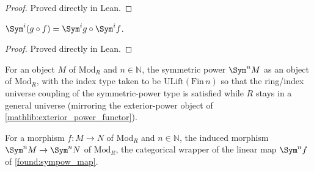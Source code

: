 \begin{proof}

\leanok
  Proved directly in Lean.
\end{proof}

\begin{lemma}
  \label{found:sympow_map_comp}
  \(\Sym^i(g\circ f)=\Sym^i g\circ\Sym^i f\).
\end{lemma}

\begin{proof}

\leanok
  Proved directly in Lean.
\end{proof}

\begin{definition}
  \label{found:modulecat_sympow_obj}
  For an object \(M\) of \(\mathrm{Mod}_R\) and \(n\in\mathbb N\), the symmetric
  power \(\Sym^n M\) as an object of \(\mathrm{Mod}_R\), with the index type taken
  to be \(\mathrm{ULift}(\mathrm{Fin}\,n)\) so that the ring/index universe
  coupling of the symmetric-power type is satisfied while \(R\) stays in a general
  universe (mirroring the exterior-power object of
  \cref{mathlib:exterior_power_functor}).
\end{definition}

\begin{definition}
  \label{found:modulecat_sympow_map}
  For a morphism \(f:M\to N\) of \(\mathrm{Mod}_R\) and \(n\in\mathbb N\), the
  induced morphism \(\Sym^n M\to\Sym^n N\) of \(\mathrm{Mod}_R\), the categorical
  wrapper of the linear map \(\Sym^n f\) of \cref{found:sympow_map}.
\end{definition}

